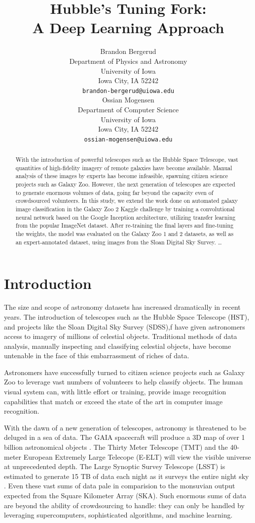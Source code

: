 \documentclass{article}
\title{Hubble's Tuning Fork: \\A Deep Learning Approach}
\author{
  Brandon Bergerud \\
  Department of Physics and Astronomy\\
  University of Iowa\\
  Iowa City, IA  52242 \\
  \texttt{brandon-bergerud@uiowa.edu} \\
  \And
  Ossian Mogensen \\
  Department of Computer Science \\
  University of Iowa \\
  Iowa City, IA  52242 \\
  \texttt{ossian-mogensen@uiowa.edu} \\
}
\begin{document}

\maketitle

\begin{abstract}
With the introduction of powerful telescopes such as the Hubble Space Telescope, vast quantities of high-fidelity imagery of remote galaxies have become available. Manual analysis of these images by experts has become infeasible, spawning citizen science projects such as Galaxy Zoo. However, the next generation of telescopes are expected to generate enormous volumes of data, going far beyond the capacity even of crowdsourced volunteers. In this study, we extend the work done on automated galaxy image classification in the Galaxy Zoo 2 Kaggle challenge by training a convolutional neural network based on the Google Inception architecture, utilizing transfer learning from the popular ImageNet dataset. After re-training the final layers and fine-tuning the weights, the model was evaluated on the Galaxy Zoo 1 and 2 datasets, as well as an expert-annotated dataset, using images from the Sloan Digital Sky Survey. \ldots
\end{abstract}

\section{Introduction}
The size and scope of astronomy datasets has increased dramatically in recent years. The introduction of telescopes such as the Hubble Space Telescope (HST), and projects like the Sloan Digital Sky Survey (SDSS),f have given astronomers access to imagery of millions of celestial objects. Traditional methods of data analysis, manually inspecting and classifying celestial objects, have become untenable in the face of this embarrassment of riches of data. 

Astronomers have successfully turned to citizen science projects such as Galaxy Zoo to leverage vast numbers of volunteers to help classify objects. The human visual system can, with little effort or training, provide image recognition capabilities that match or exceed the state of the art in computer image recognition. 

With the dawn of a new generation of telescopes, astronomy is threatened to be deluged in a sea of data. The GAIA spacecraft will produce a 3D map of over 1 billion astronomical objects \citep{2016A&A...595A...1G}. The Thirty Meter Telescope (TMT) \citep{2015RAA....15.1945S} and the 40-meter European Extremely Large Telecope (E-ELT) will view the visible universe at unprecedented depth. The Large Synoptic Survey Telescope (LSST) is estimated to generate 15 TB of data each night as it surveys the entire night sky \citep{2009AAS...21346003I}. Even these vast sums of data pale in comparision to the monsuvian output expected from the Square Kilometer Array (SKA). Such enormous sums of data are beyond the ability of crowdsourcing to handle: they can only be handled by leveraging supercomputers, sophisticated algorithms, and machine learning.
\end{document}
